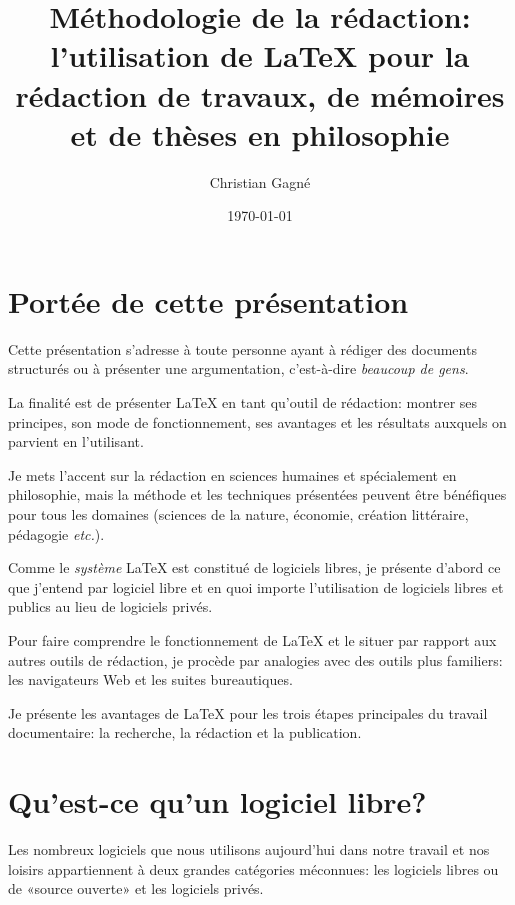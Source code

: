 \documentclass{article}
\title{Méthodologie de la rédaction: l’utilisation de \LaTeX{} pour la rédaction de travaux, de mémoires et de thèses en philosophie}
\author{Christian Gagné}
\date{\today}
\begin{document}
\maketitle

\tableofcontents

\section{Portée de cette présentation}

Cette présentation s’adresse à toute personne ayant à rédiger des documents structurés ou à présenter une argumentation, c’est-à-dire \emph{beaucoup de gens}.

La finalité est de présenter \LaTeX{} en tant qu’outil de rédaction: montrer ses principes, son mode de fonctionnement, ses avantages et les résultats auxquels on parvient en l’utilisant.

Je mets l’accent sur la rédaction en sciences humaines et spécialement en philosophie, mais la méthode et les techniques présentées peuvent être bénéfiques pour tous les domaines (sciences de la nature, économie, création littéraire, pédagogie \emph{etc.}).

Comme le \emph{système} \LaTeX{} est constitué de logiciels libres, je présente d’abord ce que j’entend par logiciel libre et en quoi importe l’utilisation de logiciels libres et publics au lieu de logiciels privés.

Pour faire comprendre le fonctionnement de \LaTeX{} et le situer par rapport aux autres outils de rédaction, je procède par analogies avec des outils plus familiers: les navigateurs Web et les suites bureautiques.

Je présente les avantages de \LaTeX{} pour les trois étapes principales du travail documentaire: la recherche, la rédaction et la publication.

\section{Qu’est-ce qu’un logiciel libre?}

Les nombreux logiciels que nous utilisons aujourd’hui dans notre travail et nos loisirs appartiennent à deux grandes catégories méconnues: les logiciels libres ou de «source ouverte» et les logiciels privés.
\end{document}
